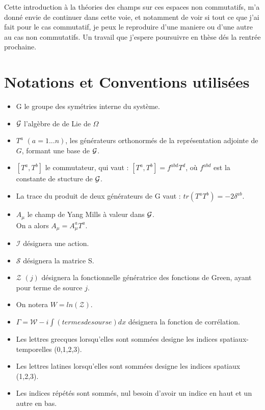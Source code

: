 \documentclass[a4paper,11pt]{article} %
\theoremstyle{plain}
\theoremstyle{definition}
\theoremstyle{remark}
\numberwithin{equation}{section}
\numberwithin{equation}{subsection}
\numberwithin{figure}{section}
\begin{document}
Cette introduction à la théories des champs sur ces espaces non commutatifs, m'a donné envie de continuer dans cette voie, et notamment de voir 
si tout ce que j'ai fait pour le cas commutatif, je peux le reproduire d'une maniere ou d'une autre au cas non commutatifs. Un travail que j'espere 
poursuivre en thèse dés la rentrée prochaine. 

\appendix
\section{Notations et Conventions utilisées}

\begin{itemize}
 \item G le groupe des symétries interne du système.
 \item $\cal{G}$ l'algèbre de de Lie de $\Omega$
 \item $T^{a}$ $(a=1...n)$, les générateurs orthonormés de la représentation adjointe de $G$, formant une base de $\cal{G}$.
 \item $[T^{a},T^{b}]$ le commutateur, qui vaut : $[T^{a},T^{b}]= f^{abd}T^{d}$, où $f^{abd}$ est la constante de stucture de $\cal{G}$.
 \item La trace du produit de deux générateurs de G vaut : $tr\left(T^{a}T^{b}\right)=-2\delta^{ab}$. 
 \item $A_{\mu}$ le champ de Yang Mills à valeur dans $\cal{G}$.\\ On a alors $A_{\mu}=A_{\mu}^{a} T^{a}$.
 \item $\mathcal{I}$ désignera une action.
 \item $\mathcal{S}$ désignera la matrice S.
 \item $\mathcal{Z}$ $(j)$ désignera la fonctionnelle génératrice des fonctions de Green, ayant pour terme de source $j$.
 \item On notera $W = ln(\mathcal{Z}) $.
 \item $\Gamma = \mathcal{W} - i \int (termes de sourse) dx $ désignera la fonction de corrélation.
 \item Les lettres grecques lorsqu'elles sont sommées designe les indices spatiaux-temporelles (0,1,2,3).
 \item Les lettres latines lorsqu'elles sont sommées designe les indices spatiaux (1,2,3).
 \item Les indices répétés sont sommés, nul besoin d'avoir un indice en haut et un autre en bas.
\end{itemize}
\end{document}
